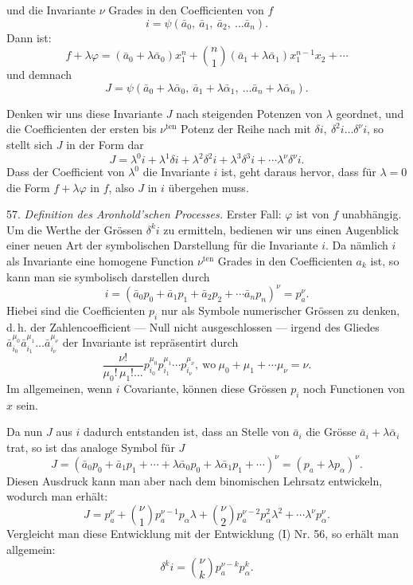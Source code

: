 und die Invariante $\nu$ Grades in den Coefficienten von $f$
\[
i = \psi (\bar a_0,\ \bar a_1,\ \bar a_2,\ \ldots \bar a_n).
\]
Dann ist:
\[
f + \lambda\varphi = (\bar a_0 + \lambda \bar\alpha_0)x_1^n + \binom{n}{1}(\bar a_1+\lambda\bar\alpha_1)x_1^{n-1}x_2 + \cdots
\]
und demnach
\[
J = \psi (\bar a_0+\lambda\bar\alpha_0,\ \bar a_1+\lambda\bar\alpha_1,\ \ldots \bar a_n+\lambda\bar\alpha_n).
\]

Denken wir uns diese Invariante $J$ nach steigenden Potenzen von
$\lambda$ geordnet, und die Coefficienten der ersten bis $\nu^{\text{ten}}$ Potenz der Reihe
nach mit $\delta i,\ \delta^2 i \ldots \delta^\nu i$, so stellt sich $J$ in der Form
dar
\[
J = \lambda^0 i + \lambda^1 \delta i + \lambda^2 \delta^2 i + \lambda^3 \delta^3 i + \cdots \lambda^\nu \delta^\nu i. \tag{I}
\]
Dass der Coefficient von $\lambda^0$ die Invariante $i$ ist, geht daraus hervor,
dass für $\lambda = 0$ die Form $f+\lambda\varphi$ in $f$, also $J$ in $i$ übergehen muss.

57. \textit{Definition des Aronhold'schen Processes.} Erster Fall: $\varphi$ ist
von $f$ unabhängig. Um die Werthe der Grössen $\delta^k i$ zu ermitteln,
bedienen wir uns einen Augenblick einer neuen Art der symbolischen
Darstellung für die Invariante $i$. Da nämlich $i$ als Invariante eine
homogene Function $\nu^{\text{ten}}$ Grades in den Coefficienten $a_k$ ist, so kann
man sie symbolisch darstellen durch
\[
i = (\bar a_0 p_0 + \bar a_1 p_1 + \bar a_2 p_2 + \cdots \bar a_n p_n)^\nu = p_a^\nu.
\]
Hiebei sind die Coefficienten $p_i$ nur als Symbole numerischer
Grössen zu denken, d.\,h. der Zahlencoefficient --- Null nicht ausge\-schlossen --- irgend des Gliedes $\bar a_{i_0}^{\mu_0}\bar a_{i_1}^{\mu_1}\ldots\bar a_{i_\nu}^{\mu_\nu}$ der Invariante ist repräsentirt durch
\[
\frac{\nu!}{\mu_0!\,\mu_1!\ldots}p_{i_0}^{\mu_0}p_{i_1}^{\mu_1}\cdots p_{i_\nu}^{\mu_\nu},\ \text{wo}\ \mu_0+\mu_1+\cdots\mu_\nu = \nu.
\]
Im allgemeinen, wenn $i$ Covariante, können diese Grössen $p_i$ noch
Functionen von $x$ sein.

Da nun $J$ aus $i$ dadurch entstanden ist, dass an Stelle von $\bar a_i$ die
Grösse $\bar a_i + \lambda\bar\alpha_i$ trat, so ist das analoge Symbol für $J$
\[
J = (\bar a_0 p_0+\bar a_1 p_1+\cdots+\lambda\bar\alpha_0 p_0+\lambda\bar\alpha_1 p_1+\cdots)^\nu = (p_a+\lambda p_\alpha)^\nu.
\]
Diesen Ausdruck kann man aber nach dem binomischen Lehrsatz ent\-wickeln, wodurch man erhält:
\[
J = p_a^\nu + \binom{\nu}{1}p_a^{\nu-1}p_\alpha\lambda + \binom{\nu}{2}p_a^{\nu-2}p_\alpha^2\lambda^2 + \cdots \lambda^\nu p_\alpha^\nu. \tag{II}
\]
Vergleicht man diese Entwicklung mit der Entwicklung (I) Nr. 56,
so erhält man allgemein:
\[
\delta^k i = \binom{\nu}{k}p_a^{\nu-k}p_\alpha^k. \tag{I}
\]


